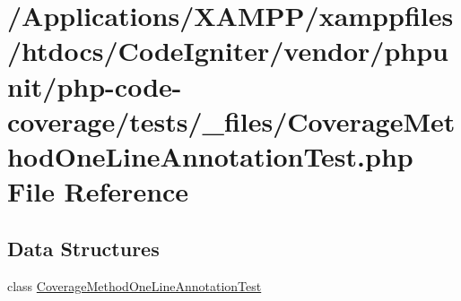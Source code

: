 \hypertarget{php-code-coverage_2tests_2__files_2_coverage_method_one_line_annotation_test_8php}{}\section{/\+Applications/\+X\+A\+M\+P\+P/xamppfiles/htdocs/\+Code\+Igniter/vendor/phpunit/php-\/code-\/coverage/tests/\+\_\+files/\+Coverage\+Method\+One\+Line\+Annotation\+Test.php File Reference}
\label{php-code-coverage_2tests_2__files_2_coverage_method_one_line_annotation_test_8php}
\subsection*{Data Structures}
\begin{DoxyCompactItemize}
\item 
class \mbox{\hyperlink{class_coverage_method_one_line_annotation_test}{Coverage\+Method\+One\+Line\+Annotation\+Test}}
\end{DoxyCompactItemize}
